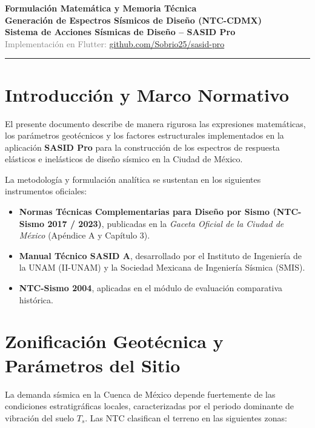 \documentclass[11pt,a4paper]{article}
\begin{document}
\begin{center}
    {\Huge\bfseries\color{primary} Formulación Matemática y Memoria Técnica}\\[6pt]
    {\LARGE\bfseries\color{headerbg} Generación de Espectros Sísmicos de Diseño (NTC-CDMX)}\\[10pt]
    {\large\textbf{Sistema de Acciones Sísmicas de Diseño -- SASID Pro}}\\[4pt]
    \textsf{\textcolor{gray}{Implementación en Flutter: \href{https://github.com/Sobrio25/sasid-pro}{github.com/Sobrio25/sasid-pro}}}\\[14pt]
    \rule{\linewidth}{1pt}
\end{center}

\vspace{0.2cm}

\section{Introducción y Marco Normativo}
El presente documento describe de manera rigurosa las expresiones matemáticas, los parámetros geotécnicos y los factores estructurales implementados en la aplicación \textbf{SASID Pro} para la construcción de los espectros de respuesta elásticos e inelásticos de diseño sísmico en la Ciudad de México.

La metodología y formulación analítica se sustentan en los siguientes instrumentos oficiales:
\begin{itemize}[noitemsep,topsep=2pt]
    \item \textbf{Normas Técnicas Complementarias para Diseño por Sismo (NTC-Sismo 2017 / 2023)}, publicadas en la \textit{Gaceta Oficial de la Ciudad de México} (Apéndice A y Capítulo 3).
    \item \textbf{Manual Técnico SASID A}, desarrollado por el Instituto de Ingeniería de la UNAM (\textsf{II-UNAM}) y la Sociedad Mexicana de Ingeniería Sísmica (\textsf{SMIS}).
    \item \textbf{NTC-Sismo 2004}, aplicadas en el módulo de evaluación comparativa histórica.
\end{itemize}

\vspace{0.2cm}

\section{Zonificación Geotécnica y Parámetros del Sitio}
La demanda sísmica en la Cuenca de México depende fuertemente de las condiciones estratigráficas locales, caracterizadas por el periodo dominante de vibración del suelo $T_s$. Las NTC clasifican el terreno en las siguientes zonas:
\end{document}

